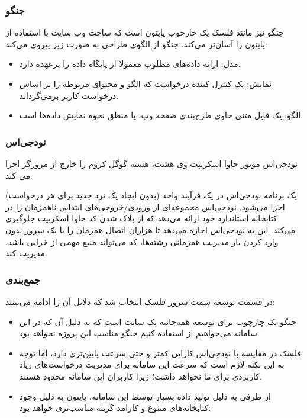 \subsubsection{جنگو }

جنگو نیز مانند فلسک یک چارچوب پایتون است که ساخت وب سایت با استفاده از پایتون را آسان‌تر می‌کند. جنگو از الگوی طراحی  به صورت زیر پیروی می‌کند\cite{noauthor_django_nodate}:

\begin{itemize}
    \item مدل: ارائه داده‌های مطلوب معمولا از پایگاه داده را برعهده دارد.
    \item نمایش: یک کنترل کننده درخواست که الگو و محتوای مربوطه را بر اساس درخواست کاربر برمی‌گرداند.
    \item الگو: یک فایل متنی حاوی طرح‌بندی صفحه وب، با منطق نحوه نمایش داده‌ها است.
\end{itemize}


\subsubsection{نودجی‌اس}
نودجی‌اس موتور جاوا اسکریپت وی هشت، هسته گوگل کروم را خارج از مرورگر اجرا می کند.

یک برنامه نودجی‌اس در یک فرآیند واحد (بدون ایجاد یک ترد جدید برای هر درخواست) اجرا می‌شود. نودجی‌اس مجموعه‌ای از ورودی/خروجی‌های ابتدایی ناهمزمان را در کتابخانه استاندارد خود ارائه می‌دهد که از بلاک شدن کد جاوا اسکریپت جلوگیری می‌کند. این به نودجی‌اس اجازه می‌دهد تا هزاران اتصال همزمان را با یک سرور بدون وارد کردن بار مدیریت همزمانی رشته‌ها، که می‌تواند منبع مهمی از خرابی باشد، مدیریت کند\cite{noauthor_introduction_nodate}.

\subsubsection{جمع‌بندی}
در قسمت توسعه سمت سرور فلسک انتخاب شد که دلایل آن را ادامه می‌بینید:
\begin{itemize}
    \item جنگو یک چارچوب برای توسعه همه‌جانبه یک سایت است که به دلیل آن که در این سامانه می‌خواهیم از  استفاده کنیم جنگو مناسب این پروژه نخواهد بود.
    \item فلسک در مقایسه با نودجی‌اس کارایی کمتر و حتی سرعت پایین‌تری دارد، اما توجه به این نکته لازم است که سرعت این سامانه برای مدیریت درخواست‌های زیاد کاربردی برای ما نخواهد داشت؛ زیرا کاربران این سامانه محدود هستند.
    \item از طرفی به دلیل تولید داده بسیار توسط این سامانه، پایتون به دلیل وجود کتابخانه‌های متنوع و کارامد گزینه مناسب‌تری خواهد بود. 
\end{itemize}


